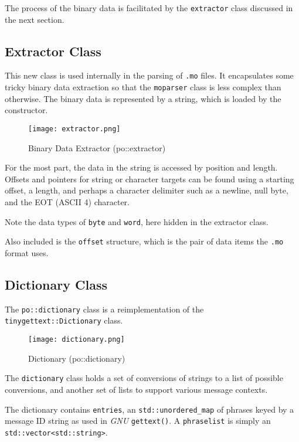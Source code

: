    The process of the binary data is facilitated by the \texttt{extractor}
   class discussed in the next section.

\subsection{Extractor Class}
\label{subsec:potext_extractor_class}

   This new class is used internally in the parsing of \texttt{.mo}
   files. It encapsulates some tricky binary data extraction
   so that the \texttt{moparser} class is less complex than otherwise.
   The binary data is represented by a string, which is loaded by the
   constructor.

\begin{figure}[H]
   \centering 
   \texttt{[image: extractor.png]}
   \caption{Binary Data Extractor (po::extractor)}
   \label{fig:potext_extractor}
\end{figure}

   For the most part, the data in the string is accessed by position and
   length. Offsets and pointers for string or character targets can be
   found using a starting offset, a length, and perhaps a character delimiter
   such as a newline, null byte, and the EOT (ASCII 4) character.

   Note the data types of \texttt{byte} and \texttt{word}, here hidden in the
   extractor class.

   Also included is the \texttt{offset} structure, which is the pair of data
   items the \texttt{.mo} format uses.

\subsection{Dictionary Class}
\label{subsec:potext_dictionary_class}

   The \texttt{po::dictionary} class is a reimplementation of the
   \texttt{tinygettext::Dictionary} class.

\begin{figure}[H]
   \centering 
   \texttt{[image: dictionary.png]}
   \caption{Dictionary (po::dictionary)}
   \label{fig:potext_dictionary}
\end{figure}

   The \texttt{dictionary} class holds a set of conversions of strings to a
   list of possible conversions, and another set of lists to support various
   message contexts.

   The dictionary contains \texttt{entries}, an \texttt{std::unordered\_map}
   of phrases keyed by a message ID string as used in \textsl{GNU}
   \texttt{gettext()}.
   A \texttt{phraselist} is simply an \texttt{std::vector<std::string>}.


